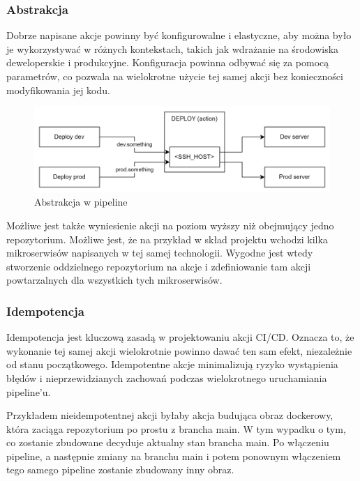 \documentclass{article}
\begin{document}
\subsubsection{Abstrakcja}

Dobrze napisane akcje powinny być konfigurowalne i elastyczne, aby można było je wykorzystywać w różnych kontekstach, takich jak wdrażanie na środowiska deweloperskie i produkcyjne. Konfiguracja powinna odbywać się za pomocą parametrów, co pozwala na wielokrotne użycie tej samej akcji bez konieczności modyfikowania jej kodu.

\begin{figure}[H]
    \centering
    \includegraphics[width=1\linewidth]{pipelinesAbstraction.png}
    \caption{Abstrakcja w pipeline}
    \label{fig:enter-label}
\end{figure}

Możliwe jest także wyniesienie akcji na poziom wyższy niż obejmujący jedno repozytorium. Możliwe jest, że na przykład w skład projektu wchodzi kilka mikroserwisów napisanych w tej samej technologii. Wygodne jest wtedy stworzenie oddzielnego repozytorium na akcje i zdefiniowanie tam akcji powtarzalnych dla wszystkich tych mikroserwisów.

\subsubsection{Idempotencja}

Idempotencja jest kluczową zasadą w projektowaniu akcji CI/CD. Oznacza to, że wykonanie tej samej akcji wielokrotnie powinno dawać ten sam efekt, niezależnie od stanu początkowego. Idempotentne akcje minimalizują ryzyko wystąpienia błędów i nieprzewidzianych zachowań podczas wielokrotnego uruchamiania pipeline'u.

Przykładem nieidempotentnej akcji byłaby akcja budująca obraz dockerowy, która zaciąga repozytorium po prostu z brancha main. W tym wypadku o tym, co zostanie zbudowane decyduje aktualny stan brancha main. Po włączeniu pipeline, a następnie zmiany na branchu main i potem ponownym włączeniem tego samego pipeline zostanie zbudowany inny obraz.
\end{document}
